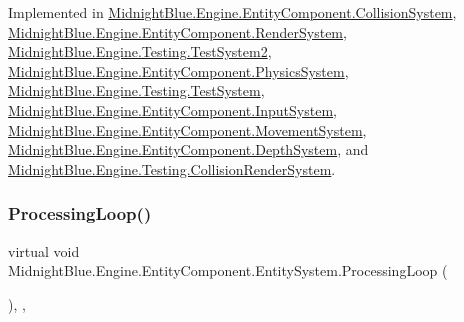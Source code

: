 Implemented in \hyperlink{class_midnight_blue_1_1_engine_1_1_entity_component_1_1_collision_system_a0fe9a2023d5fabc7861b50abfc607def}{Midnight\+Blue.\+Engine.\+Entity\+Component.\+Collision\+System}, \hyperlink{class_midnight_blue_1_1_engine_1_1_entity_component_1_1_render_system_aca6ccedef98243f0de2b2d83daa9a2bd}{Midnight\+Blue.\+Engine.\+Entity\+Component.\+Render\+System}, \hyperlink{class_midnight_blue_1_1_engine_1_1_testing_1_1_test_system2_ab8a9ea91aa5b014101ce418f66889ab0}{Midnight\+Blue.\+Engine.\+Testing.\+Test\+System2}, \hyperlink{class_midnight_blue_1_1_engine_1_1_entity_component_1_1_physics_system_ab54f8db4bba2df1072b0fa3a3f4d47de}{Midnight\+Blue.\+Engine.\+Entity\+Component.\+Physics\+System}, \hyperlink{class_midnight_blue_1_1_engine_1_1_testing_1_1_test_system_ac62a56362815c277e8c784246932fab4}{Midnight\+Blue.\+Engine.\+Testing.\+Test\+System}, \hyperlink{class_midnight_blue_1_1_engine_1_1_entity_component_1_1_input_system_a4aef070eb239e7328e6a61fee3e4d477}{Midnight\+Blue.\+Engine.\+Entity\+Component.\+Input\+System}, \hyperlink{class_midnight_blue_1_1_engine_1_1_entity_component_1_1_movement_system_a7424e4fc15c75e0f663d31110fe6792a}{Midnight\+Blue.\+Engine.\+Entity\+Component.\+Movement\+System}, \hyperlink{class_midnight_blue_1_1_engine_1_1_entity_component_1_1_depth_system_a5351ff290c847e93fb96dac6cc43719d}{Midnight\+Blue.\+Engine.\+Entity\+Component.\+Depth\+System}, and \hyperlink{class_midnight_blue_1_1_engine_1_1_testing_1_1_collision_render_system_aac900f09888531eaad6453b8534f99ab}{Midnight\+Blue.\+Engine.\+Testing.\+Collision\+Render\+System}.

\hypertarget{class_midnight_blue_1_1_engine_1_1_entity_component_1_1_entity_system_a3c740dc07a8f53fb9a1ae0769833d5ad}{}\label{class_midnight_blue_1_1_engine_1_1_entity_component_1_1_entity_system_a3c740dc07a8f53fb9a1ae0769833d5ad} 
\subsubsection{\texorpdfstring{Processing\+Loop()}{ProcessingLoop()}}
{\footnotesize\ttfamily virtual void Midnight\+Blue.\+Engine.\+Entity\+Component.\+Entity\+System.\+Processing\+Loop (\begin{DoxyParamCaption}{ }\end{DoxyParamCaption})\hspace{0.3cm}{\ttfamily [inline]}, {\ttfamily [protected]}, {\ttfamily [virtual]}}



